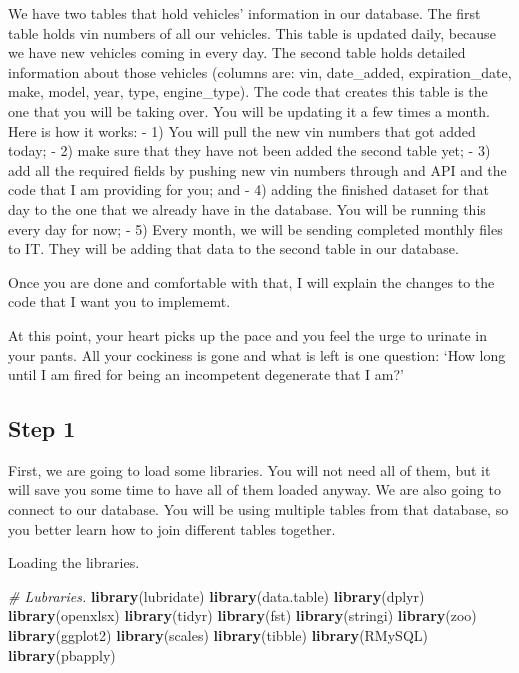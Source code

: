 \documentclass[]{book}
\newenvironment{Shaded}{\begin{snugshade}}{\end{snugshade}}
\newcommand{\CommentTok}[1]{\textcolor[rgb]{0.56,0.35,0.01}{\textit{#1}}}
\newcommand{\KeywordTok}[1]{\textcolor[rgb]{0.13,0.29,0.53}{\textbf{#1}}}
\newcommand{\NormalTok}[1]{#1}
\begin{document}
We have two tables that hold vehicles' information in our database. The first table holds vin numbers of all our vehicles. This table is updated daily, because we have new vehicles coming in every day. The second table holds detailed information about those vehicles (columns are: vin, date\_added, expiration\_date, make, model, year, type, engine\_type). The code that creates this table is the one that you will be taking over. You will be updating it a few times a month. Here is how it works:
- 1) You will pull the new vin numbers that got added today;
- 2) make sure that they have not been added the second table yet;
- 3) add all the required fields by pushing new vin numbers through and API and the code that I am providing for you; and
- 4) adding the finished dataset for that day to the one that we already have in the database. You will be running this every day for now;
- 5) Every month, we will be sending completed monthly files to IT. They will be adding that data to the second table in our database.

Once you are done and comfortable with that, I will explain the changes to the code that I want you to implememt.

At this point, your heart picks up the pace and you feel the urge to urinate in your pants. All your cockiness is gone and what is left is one question: `How long until I am fired for being an incompetent degenerate that I am?'

\hypertarget{step-1}{%
\subsection{Step 1}\label{step-1}}

First, we are going to load some libraries. You will not need all of them, but it will save you some time to have all of them loaded anyway. We are also going to connect to our database. You will be using multiple tables from that database, so you better learn how to join different tables together.

Loading the libraries.

\begin{Shaded}
\begin{Highlighting}[]
\CommentTok{# Lubraries.}
  \KeywordTok{library}\NormalTok{(lubridate) }
  \KeywordTok{library}\NormalTok{(data.table) }
  \KeywordTok{library}\NormalTok{(dplyr) }
  \KeywordTok{library}\NormalTok{(openxlsx) }
  \KeywordTok{library}\NormalTok{(tidyr) }
  \KeywordTok{library}\NormalTok{(fst) }
  \KeywordTok{library}\NormalTok{(stringi)}
  \KeywordTok{library}\NormalTok{(zoo) }
  \KeywordTok{library}\NormalTok{(ggplot2) }
  \KeywordTok{library}\NormalTok{(scales) }
  \KeywordTok{library}\NormalTok{(tibble) }
  \KeywordTok{library}\NormalTok{(RMySQL)}
  \KeywordTok{library}\NormalTok{(pbapply)}
\end{Highlighting}
\end{Shaded}
\end{document}
